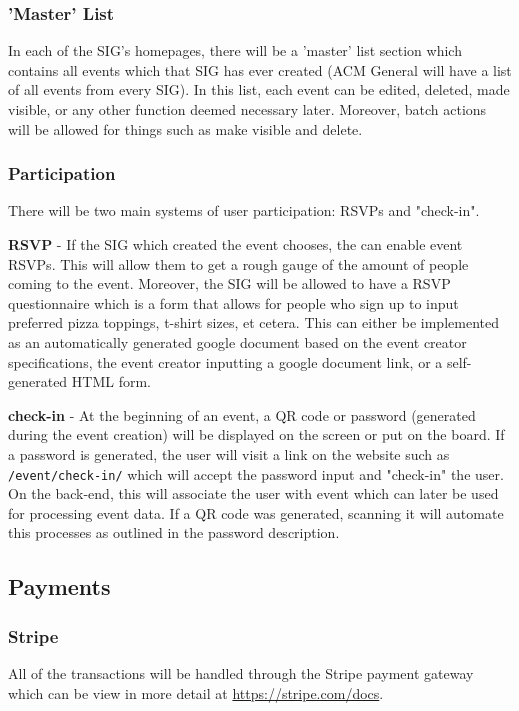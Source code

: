 \documentclass{article}
\begin{document}
\subsubsection{'Master' List}
In each of the SIG's homepages, there will be a 'master' list section which
contains all events which that SIG has ever created (ACM General will have a
list of all events from every SIG). In this list, each event can be edited,
deleted, made visible, or any other function deemed necessary later. Moreover,
batch actions will be allowed for things such as make visible and delete.

\subsubsection{Participation}
\label{sec:participation}
There will be two main systems of user participation: RSVPs and "check-in".

\textbf{RSVP} - If the SIG which created the event chooses, the can enable event
RSVPs. This will allow them to get a rough gauge of the amount of people coming
to the event. Moreover, the SIG will be allowed to have a RSVP questionnaire which
is a form that allows for people who sign up to input preferred pizza toppings, 
t-shirt sizes, et cetera. This can either be implemented as an automatically generated
google document based on the event creator specifications, the event creator
inputting a google document link, or a self-generated HTML form. 

\textbf{check-in} - At the beginning of an event, a QR code or password (generated
during the event creation) will be displayed on the screen or put on the board.
If a password is generated, the user will visit a link on the website such as
\texttt{/event/check-in/} which will accept the password input and "check-in"
the user. On the back-end, this will associate the user with event which can
later be used for processing event data. If a QR code was generated, scanning it
will automate this processes as outlined in the password description.

\subsection{Payments}
\subsubsection{Stripe}
All of the transactions will be handled through the Stripe payment gateway which
can be view in more detail at \url{https://stripe.com/docs}.
\end{document}
